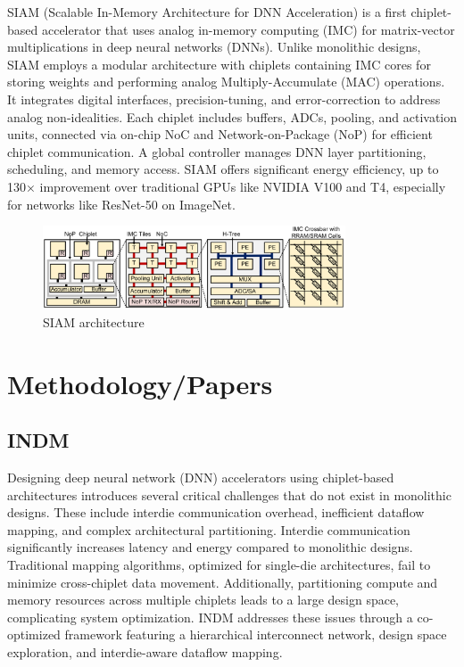 \documentclass[acmsmall]{acmart}
\begin{document}
SIAM (Scalable In-Memory Architecture for DNN Acceleration) is a first chiplet-based accelerator that uses analog in-memory computing (IMC) for matrix-vector multiplications in deep neural networks (DNNs). Unlike monolithic designs, SIAM employs a modular architecture with chiplets containing IMC cores for storing weights and performing analog Multiply-Accumulate (MAC) operations. It integrates digital interfaces, precision-tuning, and error-correction to address analog non-idealities. Each chiplet includes buffers, ADCs, pooling, and activation units, connected via on-chip NoC and Network-on-Package (NoP) for efficient chiplet communication. A global controller manages DNN layer partitioning, scheduling, and memory access. SIAM offers significant energy efficiency, up to 130× improvement over traditional GPUs like NVIDIA V100 and T4, especially for networks like ResNet-50 on ImageNet.

\begin{figure}[h]
  \centering
  \includegraphics[width=0.8\textwidth]{figures/siamArchitecture.png}
  \caption{SIAM architecture \cite{siam}}
  \label{fig:siamArchitecture}
\end{figure}



\section{Methodology/Papers}
\subsection{INDM}
Designing deep neural network (DNN) accelerators using chiplet-based architectures introduces several critical challenges that do not exist in monolithic designs.
These include interdie communication overhead, inefficient dataflow mapping, and complex architectural partitioning.
Interdie communication significantly increases latency and energy compared to monolithic designs. Traditional mapping algorithms, optimized for single-die architectures, fail to minimize cross-chiplet data movement. 
Additionally, partitioning compute and memory resources across multiple chiplets leads to a large design space, complicating system optimization. 
INDM addresses these issues through a co-optimized framework featuring a hierarchical interconnect network, design space exploration, and interdie-aware dataflow mapping.\\
\end{document}
